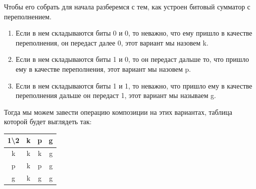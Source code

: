 \documentclass{article}
\begin{document}
Чтобы его собрать для начала разберемся с тем, как устроен битовый сумматор с переполнением. 
\begin{enumerate}
    \item Если в нем складываются биты 0 и 0, то неважно, что ему пришло в качестве переполнения, он передаст далее 0, этот вариант мы назовем k.
    \item Если в нем складываются биты 1 и 0, то он передаст дальше то, что пришло ему в качестве переполнения, этот вариант мы назовем p.
    \item Если в нем складываются биты 1 и 1, то неважно, что пришло ему в качестве переполнения дальше он передаст 1, этот вариант мы называем g. 
\end{enumerate}

Тогда мы можем завести операцию композиции на этих вариантах, таблица которой будет выглядеть так:
\begin{center}
    \begin{tabular}{ |c|c|c|c| }
        \hline
         1\textbackslash2 & k & p & g \\
        \hline
         k & k & k & g \\
        \hline
         p & k & p & g \\
        \hline
         g & k & g & g \\
        \hline
    \end{tabular}
\end{center}
\end{document}
